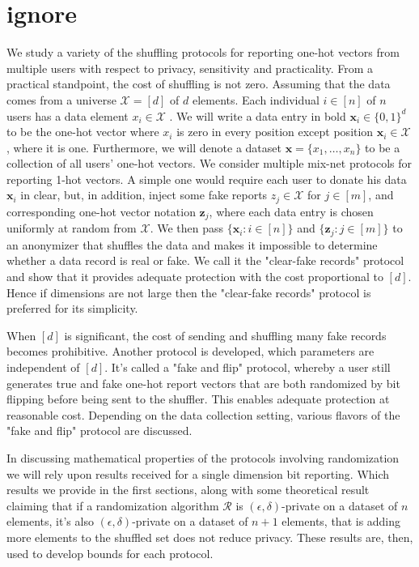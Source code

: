 \documentclass[11pt]{article}
\newcommand{\bbx}{\pmb{x}}
\newcommand{\bbz}{\pmb{z}}
\newcommand{\cX}{\mathcal{X}}
\newcommand{\cR}{\mathcal{R}}
\begin{document}
\section{ignore}
We study a variety of the shuffling protocols for reporting one-hot vectors from multiple users with respect to privacy, sensitivity and practicality.  From a practical standpoint, the cost of shuffling is not zero. 
Assuming that the data comes from a universe $\cX = [d]$ of $d$ elements. Each individual $i \in [n]$ of $n$ users has a data element $x_i\in \cX$ . We will write a data entry in bold $\bbx_i \in \{0, 1\}^d $ to be the one-hot vector where $x_i$ is zero in every position except position $\bbx_i \in \cX$ , where it is one. Furthermore, we will denote a dataset $\bbx = \{x_1,\dots ,x_n\}$ to be a collection of all users' one-hot vectors. We consider multiple mix-net protocols for reporting 1-hot vectors.  A simple one would require each user to donate his data $\bbx_i$ in clear, but, in addition, inject some fake reports $z_j\in \cX$ for $j \in [m]$, and corresponding one-hot vector notation $\bbz_j$, where each data entry is chosen uniformly at random from $\cX$. We then pass $\{\bbx_i : i \in [n]\}$ and $\{\bbz_j : j \in [m]\} $ to an anonymizer that shuffles the data and makes it impossible to determine whether a data record is real or fake.  We call it the "clear-fake records" protocol and show that it provides adequate protection with the cost proportional to $[d]$. Hence if dimensions are not large then the "clear-fake records" protocol is preferred for its simplicity. 

When $[d]$ is significant, the cost of sending and shuffling many fake records becomes prohibitive. Another protocol is developed,  which parameters are independent of $[d]$.  It's called a "fake and flip" protocol, whereby  a user still generates true and fake one-hot report vectors that are both randomized by bit flipping before being sent to the shuffler.  This enables adequate protection at reasonable cost. Depending on the data collection setting, various flavors of the "fake and flip" protocol are discussed.

In discussing mathematical properties of the protocols involving randomization we will rely upon results received for a single dimension bit reporting.  Which results we provide in the first sections, along with some theoretical result claiming that if a randomization algorithm  $\cR$ is $(\epsilon, \delta)$-private on a dataset of $n$ elements, it's also  $(\epsilon, \delta)$-private on a dataset of $n+1$ elements, that is adding more elements to the shuffled set does not reduce privacy. These results are, then, used to develop bounds for each protocol.
\end{document}
